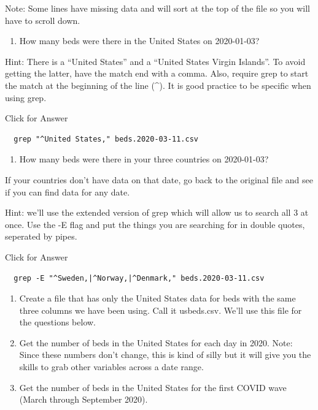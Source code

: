 \documentclass[
]{book}
\providecommand{\tightlist}{%
  \setlength{\itemsep}{0pt}\setlength{\parskip}{0pt}}
\begin{document}
Note: Some lines have missing data and will sort at the top of the file so you will have to scroll down.

\begin{enumerate}
\def\labelenumi{\arabic{enumi}.}
\setcounter{enumi}{16}
\tightlist
\item
  How many beds were there in the United States on 2020-01-03?
\end{enumerate}

Hint: There is a ``United States'' and a ``United States Virgin Islands''. To avoid getting the latter, have the match end with a comma. Also, require grep to start the match at the beginning of the line (\^{}). It is good practice to be specific when using grep.

Click for Answer

\begin{verbatim}
  grep "^United States," beds.2020-03-11.csv
\end{verbatim}

\hfill\break

\begin{enumerate}
\def\labelenumi{\arabic{enumi}.}
\setcounter{enumi}{17}
\tightlist
\item
  How many beds were there in your three countries on 2020-01-03?
\end{enumerate}

If your countries don't have data on that date, go back to the original file and see if you can find data for any date.

Hint: we'll use the extended version of grep which will allow us to search all 3 at once. Use the -E flag and put the things you are searching for in double quotes, seperated by pipes.

Click for Answer

\begin{verbatim}
  grep -E "^Sweden,|^Norway,|^Denmark," beds.2020-03-11.csv
\end{verbatim}

\hfill\break

\begin{enumerate}
\def\labelenumi{\arabic{enumi}.}
\setcounter{enumi}{18}
\item
  Create a file that has only the United States data for beds with the same three columns we have been using. Call it usbeds.csv. We'll use this file for the questions below.
\item
  Get the number of beds in the United States for each day in 2020. Note: Since these numbers don't change, this is kind of silly but it will give you the skills to grab other variables across a date range.
\item
  Get the number of beds in the United States for the first COVID wave (March through September 2020).
\end{enumerate}
\end{document}
